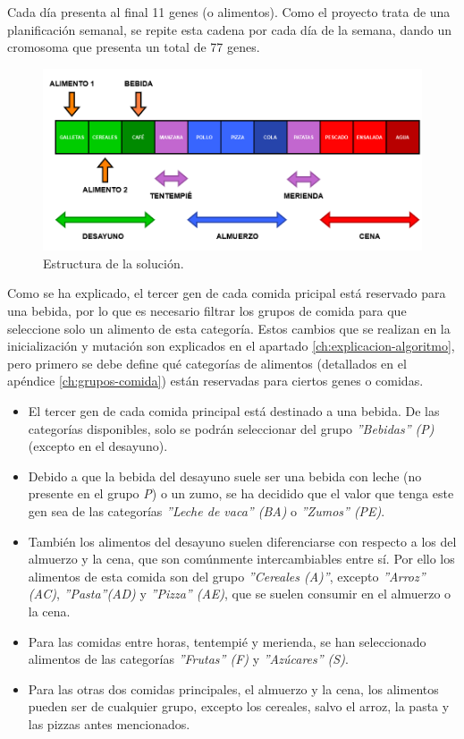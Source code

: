 Cada día presenta al final 11 genes (o alimentos). Como el proyecto trata de una planificación semanal, se repite esta cadena por cada día de la semana, dando un cromosoma que presenta un total de 77 genes.

\begin{figure}[H]
    \centering
    \includegraphics[width=1\textwidth]{figures/cromosoma_desarrollo.png}
    \caption{Estructura de la solución.}
    \label{fig:cromosoma_desarrollo}
\end{figure}

Como se ha explicado, el tercer gen de cada comida pricipal está reservado para una bebida, por lo que es necesario filtrar los grupos de comida para que seleccione solo un alimento de esta categoría. Estos cambios que se realizan en la inicialización y mutación son explicados en el apartado \ref{ch:explicacion-algoritmo}, pero primero se debe define qué categorías de alimentos (detallados en el apéndice \ref{ch:grupos-comida}) están reservadas para ciertos genes o comidas.

\begin{itemize}
    \item El tercer gen de cada comida principal está destinado a una bebida. De las categorías disponibles, solo se podrán seleccionar del grupo \textit{''Bebidas'' (P)}(excepto en el desayuno).
    \item Debido a que la bebida del desayuno suele ser una bebida con leche (no presente en el grupo \textit{P}) o un zumo, se ha decidido que el valor que tenga este gen sea de las categorías \textit{''Leche de vaca'' (BA)} o \textit{''Zumos'' (PE)}.
    \item También los alimentos del desayuno suelen diferenciarse con respecto a los del almuerzo y la cena, que son comúnmente intercambiables entre sí. Por ello los alimentos de esta comida son del grupo \textit{''Cereales (A)''}, excepto \textit{''Arroz'' (AC)}, \textit{''Pasta''(AD)} y \textit{''Pizza'' (AE)}, que se suelen consumir en el almuerzo o la cena.
    \item Para las comidas entre horas, tentempié y merienda, se han seleccionado alimentos de las categorías \textit{''Frutas'' (F)} y \textit{''Azúcares'' (S)}.
    \item Para las otras dos comidas principales, el almuerzo y la cena, los alimentos pueden ser de cualquier grupo, excepto los cereales, salvo el arroz, la pasta y las pizzas antes mencionados.
\end{itemize}


